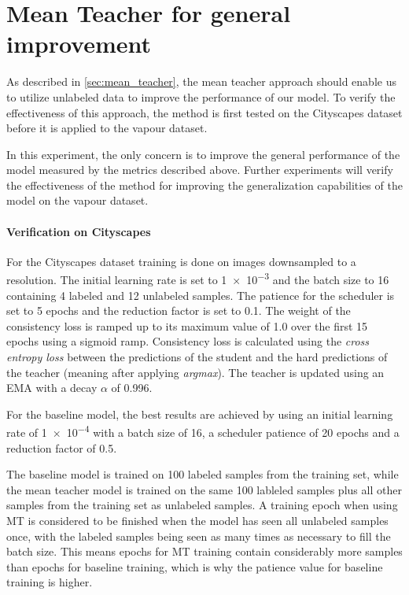 \section{Mean Teacher for general improvement}
\label{sec:mean_teacher_general}

As described in \ref{sec:mean_teacher}, the mean teacher approach should enable us to utilize unlabeled data to improve the performance of our model.
To verify the effectiveness of this approach, the method is first tested on the Cityscapes dataset before it is applied to the vapour dataset.

In this experiment, the only concern is to improve the general performance of the model measured by the metrics described above. 
Further experiments will verify the effectiveness of the method for improving the generalization capabilities of the model on the vapour dataset.

\paragraph{Verification on Cityscapes} 

For the Cityscapes dataset training is done on images downsampled to a  resolution. The initial learning rate is set to \num{1e-3} and the batch size to 16 containing 4 labeled and 12 unlabeled samples. The patience for the scheduler is set to 5 epochs and the reduction factor is set to \num{0.1}.
The weight of the consistency loss is ramped up to its maximum value of \num{1.0} over the first 15 epochs using a sigmoid ramp.
Consistency loss is calculated using the \emph{cross entropy loss} between the predictions of the student and the hard predictions of the teacher (meaning after applying \emph{argmax}).
The teacher is updated using an EMA with a decay $\alpha$ of \num{0.996}.

For the baseline model, the best results are achieved by using an initial learning rate of \num{1e-4} with a batch size of 16, a scheduler patience of 20 epochs and a reduction factor of \num{0.5}. 

The baseline model is trained on 100 labeled samples from the training set, while the mean teacher model is trained on the same 100 lableled samples plus all other samples from the training set as unlabeled samples.
A training epoch when using MT is considered to be finished when the model has seen all unlabeled samples once, with the labeled samples being seen as many times as necessary to fill the batch size. This means epochs for MT training contain considerably more samples than epochs for baseline training, which is why the patience value for baseline training is higher.

